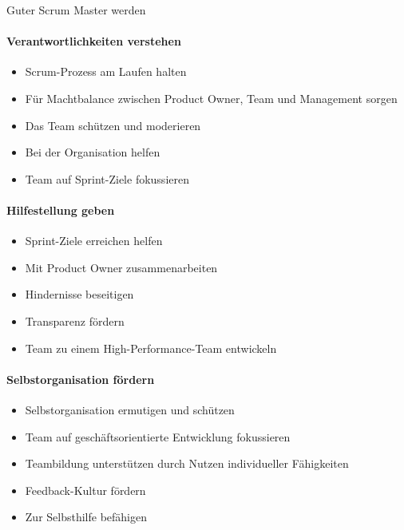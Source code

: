 \begin{KR}{Guter Scrum Master werden}\\
    \paragraph{Verantwortlichkeiten verstehen}
    \begin{itemize}
        \item Scrum-Prozess am Laufen halten
        \item Für Machtbalance zwischen Product Owner, Team und Management sorgen
        \item Das Team schützen und moderieren
        \item Bei der Organisation helfen
        \item Team auf Sprint-Ziele fokussieren
    \end{itemize}
    
    \paragraph{Hilfestellung geben}
    \begin{itemize}
        \item Sprint-Ziele erreichen helfen
        \item Mit Product Owner zusammenarbeiten
        \item Hindernisse beseitigen
        \item Transparenz fördern
        \item Team zu einem High-Performance-Team entwickeln
    \end{itemize}
    
    \paragraph{Selbstorganisation fördern}
    \begin{itemize}
        \item Selbstorganisation ermutigen und schützen
        \item Team auf geschäftsorientierte Entwicklung fokussieren
        \item Teambildung unterstützen durch Nutzen individueller Fähigkeiten
        \item Feedback-Kultur fördern
        \item Zur Selbsthilfe befähigen
    \end{itemize}
\end{KR}

